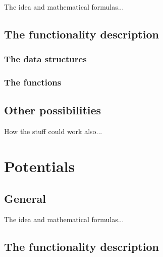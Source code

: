 \documentclass[12pt,a4paper]{report}
\begin{document}
The idea and mathematical formulas...


\subsection{The functionality description}
\subsubsection{The data structures}

\subsubsection{The functions}


\subsection{Other possibilities}

How the stuff could work also...


\newpage
\section{Potentials}
\subsection{General}

The idea and mathematical formulas...


\subsection{The functionality description}
\end{document}
